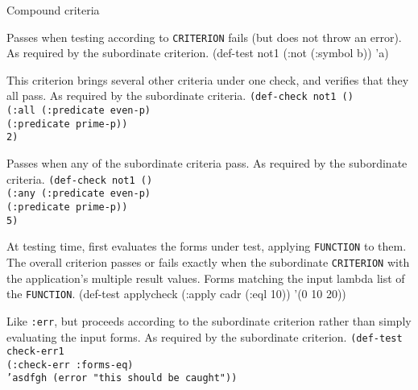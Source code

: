 \begin{criteriaGroup}{Compound criteria}{}

{Passes when testing according to \texttt{CRITERION} fails (but
does not throw an error).}
{As required by the subordinate criterion.}
{\noExpl}
{\singleEx}{(def-test not1 (:not (:symbol b)) 'a)}

{This criterion brings several other criteria under one check, and
verifies that they all pass.}
{As required by the subordinate criteria.}
{\noExpl}
{\tabbingEx}{\texttt{(de}\=\texttt{f-}\=\texttt{check not1 ()}
\\ \>\>\texttt{(:all }\=\texttt{(:predicate even-p)}
\\ \>\>\>\texttt{(:predicate prime-p))}
\\ \>\texttt{2)}}

{Passes when any of the subordinate criteria pass.}
{As required by the subordinate criteria.}
{\noExpl}
{\tabbingEx}{
\texttt{(de}\=\texttt{f-}\=\texttt{check not1 ()}
\\ \>\>\texttt{(:any }\=\texttt{(:predicate even-p)}
\\ \>\>\>\texttt{(:predicate prime-p))}
\\ \>\texttt{5)}}

{At testing time, first evaluates the forms under test, applying
  \texttt{FUNCTION} to them.  The overall criterion passes or fails
  exactly when the subordinate \texttt{CRITERION} with the
  application's multiple result values.}
{Forms matching the input lambda list of the \texttt{FUNCTION}.}
{\noExpl}
{\singleEx}{(def-test applycheck (:apply cadr (:eql 10)) '(0 10 20))}

{Like \texttt{:err}, but proceeds according to the subordinate
criterion rather than simply evaluating the input forms.}
{As required by the subordinate criterion.}
{}
{\tabbingEx}
{\texttt{(de}\=\texttt{f-}\=\texttt{test check-err1}
\\ \> \> \texttt{(:check-err :forms-eq)}
\\ \> \texttt{'asdfgh (error "this should be caught"))}}


\end{criteriaGroup}
